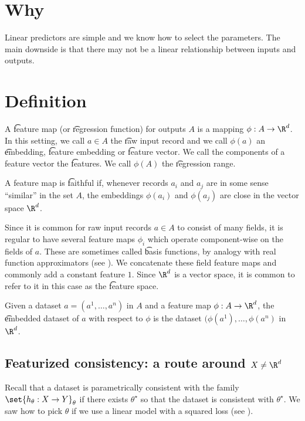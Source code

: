 

\section*{Why}

Linear predictors are simple and we know how to select the parameters.
The main downside is that there may not be a linear relationship between inputs and outputs.

\section*{Definition}

A \t{feature map} (or \t{regression function}) for outputs $A$ is a mapping $\phi : A \to \R ^d$.
In this setting, we call $a \in A$ the \t{raw input record} and we call $\phi (a)$ an \t{embedding}, \t{feature embedding} or \t{feature vector}.
We call the components of a feature vector the \t{features}.
We call $\phi (A)$ the \t{regression range}.

A feature map is \t{faithful} if, whenever records $a_i$ and $a_j$ are in some sense ``similar'' in the set $A$, the embeddings $\phi (a_i)$ and $\phi (a_j)$ are close in the vector space $\R ^d$.

Since it is common for raw input records $a \in A$ to consist of many fields, it is regular to have several feature maps $\phi _i$ which operate component-wise on the fields of $a$.
These are sometimes called \t{basis functions}, by analogy with real function approximators (see ).
We concatenate these field feature maps and commonly add a constant feature $1$.
Since $\R ^d$ is a vector space, it is common to refer to it in this case as the \t{feature space}.

Given a dataset $a = (a^1, \dots , a^n)$ in $A$ and a feature map $\phi : A \to \R ^d$, the \t{embedded dataset} of $a$ with respect to $\phi $ is the dataset $(\phi (a^1), \dots , \phi (a^n)$ in $\R ^d$.

\subsection*{Featurized consistency: a route around $X \neq \R ^d$}

Recall that a dataset is parametrically consistent with the family $\set{h_{\theta }: X \to Y}_{\theta }$ if there exists $\theta ^\star$ so that the dataset is consistent with $\theta ^{\star}$.
We saw how to pick $\theta $ if we use a linear model with a squared loss (see ).

